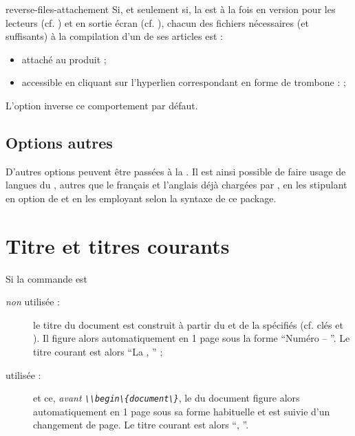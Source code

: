 \documentclass{letgut}
\begin{document}
\begin{docKey}[][doc new={2023-01-14}]{reverse-files-attachement}{}{}
  Si, et seulement si, la  est à la fois en version pour les lecteurs
  (cf. ) et en sortie écran (cf. ), chacun
  des fichiers nécessaires (et suffisants) à la compilation d'un de ses articles
  est :
  \begin{itemize}
  \item attaché au \pdf{} produit ;
  \item accessible en cliquant sur l'hyperlien correspondant en forme de
    trombone : \noattachfile[icon=Paperclip] ;
  \end{itemize}
  L'option  inverse ce comportement par
  défaut.
\end{docKey}

\subsection{Options autres}
\label{sec:options-autres}

D'autres options peuvent être passées à la . Il est ainsi possible
de faire usage de langues du , autres que le français et
l'anglais déjà chargées par , en les stipulant en option de
 et en les employant selon la syntaxe de ce
package.

\section{Titre et titres courants}
\label{sec:titre}
Si la commande  est
\begin{description}
\item[\emph{non} utilisée :] le titre du document est construit à partir du
   et de la  spécifiés (cf. clés  et
  ). Il figure alors automatiquement en 1\iere{} page sous la forme
  \enquote{Numéro  -- }. Le titre courant est alors
  \enquote{La , } ;
\item[ utilisée\footnotemark{} :]  et
  ce, \emph{avant \lstinline+\\begin\{document\}+}, le  du document
  figure alors automatiquement en 1\iere{} page sous sa forme habituelle et est
  suivie d'un changement de page. Le titre courant est alors
  \enquote{, }.
\end{description}
\end{document}
